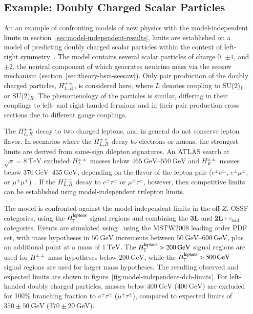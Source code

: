 \subsection{Example: Doubly Charged Scalar Particles}
An an example of confronting models of new physics with the model-independent limits in section~\ref{sec:model-independent-results}, limits are established on a model of predicting doubly charged scalar particles within the context of left-right symmetry~\cite{Pati:1974yy,Mohapatra:1974hk,Senjanovic:1975rk,Rizzo:1981xx}. The model contains several scalar particles of charge 0, $\pm1$, and $\pm2$, the neutral component of which generates neutrino mass via the seesaw mechanism (section~\ref{sec:theory-bsm-seesaw}). Only pair production of the doubly charged particles, $H^{\pm\pm}_{L,R}$, is considered here, where $L$ denotes coupling to SU(2)$_L$ or SU(2)$_R$. The phenomenology of the particles is similar, differing in their couplings to left- and right-handed fermions and in their pair production cross sections due to different gauge couplings. 

The $H^{\pm\pm}_{L,R}$ decay to two charged leptons, and in general do not conserve lepton flavor. In scenarios where the $H^{\pm\pm}_{L,R}$ decay to electrons or muons, the strongest limits are derived from same-sign dilepton signatures. An ATLAS search at $\sqrt{s}=\SI{8}{\tera\electronvolt}$ excluded $H^{\pm\pm}_L$ masses below $\SIrange[range-phrase=-]{465}{550}{\giga\electronvolt}$ and $H^{\pm\pm}_R$ masses below $\SIrange[range-phrase=-]{370}{435}{\giga\electronvolt}$, depending on the flavor of the lepton pair ($e^{\pm}e^{\pm}$, $e^{\pm}\mu^{\pm}$, or $\mu^{\pm}\mu^{\pm}$)~\cite{TheATLASCollaboration:2015gu}. If the $H^{\pm\pm}_{L,R}$ decay to $e^{\pm}\tau^{\pm}$ or $\mu^{\pm}\tau^{\pm}$, however, then competitive limits can be established using model-independent trilepton limits. 

The model is confronted against the model-independent limits in the off-$Z$, OSSF categories, using the $H_{\mathrm{T}}^{\mathrm{leptons}}$ signal regions and combining the \textbf{3L} and \textbf{2L$+\tau_{\mathrm{had}}$} categories. Events are simulated using \ using the MSTW2008 leading order PDF set, with mass hypotheses in $\SI{50}{\giga\electronvolt}$ increments between $\SIrange[range-phrase=-]{50}{600}{\giga\electronvolt}$, plus an additional point at a mass of $\SI{1}{\tera\electronvolt}$. The $H_{\mathrm{T}}^{\mathrm{leptons}}>\SI{200}{\giga\electronvolt}$ signal regions are used for $H^{\pm\pm}$ mass hypotheses below $\SI{200}{\giga\electronvolt}$, while the $H_{\mathrm{T}}^{\mathrm{leptons}}>\SI{500}{\giga\electronvolt}$ signal regions are used for larger mass hypotheses. The resulting observed and expected limits are shown in figure~\ref{fig:model-independent-dch-limits}. For left-handed doubly charged particles, masses below $\SI{400}{\giga\electronvolt}$ ($\SI{400}{\giga\electronvolt}$) are excluded for 100\% branching fraction to $e^{\pm}\tau^{\pm}$ ($\mu^{\pm}\tau^{\pm}$), compared to expected limits of $350\pm\SI{50}{\giga\electronvolt}$ ($370\pm\SI{20}{\giga\electronvolt}$). 

